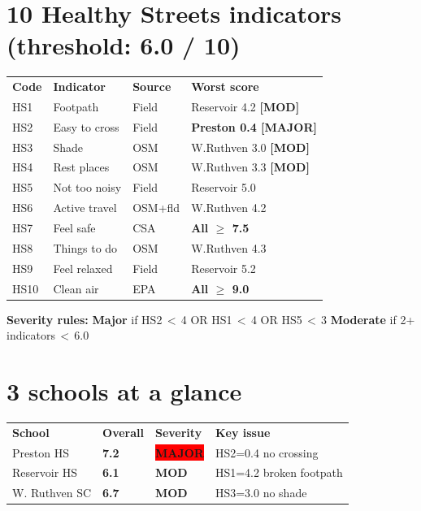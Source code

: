 \documentclass[9pt,a4paper]{extarticle}
\newcommand{\kw}[1]{\textbf{\color{DG}#1}}
\newcommand{\good}[1]{\textbf{\color{MG}#1}}
\newcommand{\warn}[1]{\textbf{\color{AMB}#1}}
\newcommand{\bad}[1]{\textbf{\color{RED}#1}}
\newcommand{\tag}[2]{\colorbox{#1}{\tiny\color{white}\textbf{#2}}}
\begin{document}
\begin{multicols}{2}
\section{10 Healthy Streets indicators (threshold: 6.0 / 10)}

\begin{tabular}{@{}C{0.56cm} L{1.8cm} L{1.6cm} L{2.6cm}@{}}
\color{white}\tiny\textbf{Code} &
\color{white}\tiny\textbf{Indicator} &
\color{white}\tiny\textbf{Source} &
\color{white}\tiny\textbf{Worst score} \\
HS1 & Footpath      & Field   & Reservoir 4.2 \warn{[MOD]} \\
HS2 & Easy to cross & Field   & \bad{Preston 0.4 [MAJOR]} \\
HS3 & Shade         & OSM     & W.Ruthven 3.0 \warn{[MOD]} \\
HS4 & Rest places   & OSM     & W.Ruthven 3.3 \warn{[MOD]} \\
HS5 & Not too noisy & Field   & Reservoir 5.0 \\
HS6 & Active travel & OSM+fld & W.Ruthven 4.2 \\
HS7 & Feel safe     & CSA     & \good{All $\geq$ 7.5} \\
HS8 & Things to do  & OSM     & W.Ruthven 4.3 \\
HS9 & Feel relaxed  & Field   & Reservoir 5.2 \\
HS10& Clean air     & EPA     & \good{All $\geq$ 9.0} \\
\end{tabular}

\vspace{3pt}
\kw{Severity rules:} \bad{Major} if HS2\,$<$\,4 OR HS1\,$<$\,4 OR HS5\,$<$\,3 \textbullet{}
\warn{Moderate} if 2+ indicators\,$<$\,6.0

\section{3 schools at a glance}

\begin{tabular}{@{}L{2.2cm} C{0.9cm} C{1.0cm} L{3.2cm}@{}}
\color{white}\tiny\textbf{School} &
\color{white}\tiny\textbf{Overall} &
\color{white}\tiny\textbf{Severity} &
\color{white}\tiny\textbf{Key issue} \\
Preston HS     & \bad{7.2} & \tag{RED}{MAJOR}    & HS2=0.4 no crossing \\
Reservoir HS   & \warn{6.1}& \tag{AMB}{MOD}      & HS1=4.2 broken footpath \\
W. Ruthven SC  & \warn{6.7}& \tag{AMB}{MOD}      & HS3=3.0 no shade \\
\end{tabular}


\end{multicols}
\end{document}
